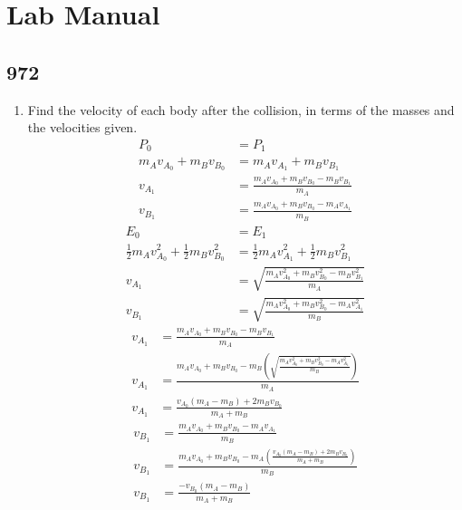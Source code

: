 \documentclass{article}
\begin{document}
\section{Lab Manual}

\subsection{972}

\begin{enumerate}[label = \textbf{(\alph*)}]
	\item Find the velocity of each body after the collision, in terms of the masses and the velocities given.
		\begin{align*}
			P_0 & = P_1 \\
			m_Av_{A_0} + m_Bv_{B_0} & = m_Av_{A_1} + m_Bv_{B_1} \\
			v_{A_1} & = \frac{ m_Av_{A_0} + m_Bv_{B_0} - m_Bv_{B_1} }{ m_A } \\
			v_{B_1} & = \frac{ m_Av_{A_0} + m_Bv_{B_0} - m_Av_{A_1} }{ m_B }
		\end{align*}
		\begin{align*}
			E_0 & = E_1 \\
			\frac{1}{2}m_Av_{A_0}^2 + \frac{1}{2}m_Bv_{B_0}^2 & = \frac{1}{2}m_Av_{A_1}^2 + \frac{1}{2}m_Bv_{B_1}^2 \\
			v_{A_1} & = \sqrt{ \frac{ m_Av_{A_0}^2 + m_Bv_{B_0}^2 - m_Bv_{B_1}^2 }{ m_A } } \\
			v_{B_1} & = \sqrt{ \frac{ m_Av_{A_0}^2 + m_Bv_{B_0}^2 - m_Av_{A_1}^2 }{ m_B } }
		\end{align*}
		\begin{align*}
			v_{A_1} & = \frac{ m_Av_{A_0} + m_Bv_{B_0} - m_Bv_{B_1} }{ m_A } \\
			v_{A_1} & = \frac{ m_Av_{A_0} + m_Bv_{B_0} - m_B \left( \sqrt{ \frac{ m_Av_{A_0}^2 + m_Bv_{B_0}^2 - m_Av_{A_1}^2 }{ m_B } } \right) }{ m_A } \\
			v_{A_1} & = \frac{ v_{A_0}(m_A - m_B) + 2m_Bv_{B_0} }{ m_A + m_B }
		\end{align*}
		\begin{align*}
			v_{B_1} & = \frac{ m_Av_{A_0} + m_Bv_{B_0} - m_Av_{A_1} }{ m_B } \\
			v_{B_1} & = \frac{ m_Av_{A_0} + m_Bv_{B_0} - m_A \left( \frac{ v_{A_0}(m_A - m_B) + 2m_Bv_{B_0} }{ m_A + m_B } \right) }{ m_B } \\
			v_{B_1} & = \frac{ -v_{B_0}(m_A - m_B) }{ m_A + m_B }
		\end{align*}
		\begin{mdframed}

\end{mdframed}
\end{enumerate}
\end{document}
